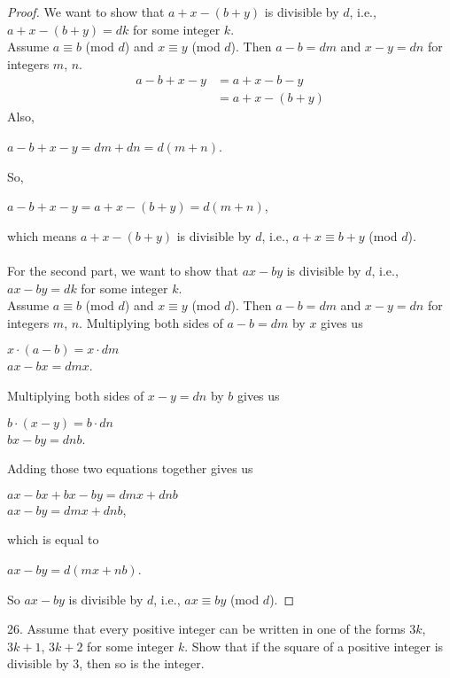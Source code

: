 \documentclass[12pt]{article}
\begin{document}
\begin{proof}
We want to show that $a+x-(b+y)$ is divisible by $d$, i.e., $a+x-(b+y)=dk$ for some integer $k$. \\
Assume $a\equiv b$ (mod $d$) and $x\equiv y$ (mod $d$). Then $a-b=dm$ and $x-y=dn$ for integers $m$, $n$.
\begin{align*}
a-b+x-y&=a+x-b-y \\
&=a+x-(b+y)
\end{align*}
Also,
\begin{center}
$a-b+x-y=dm+dn=d(m+n)$.
\end{center}
So,
\begin{center}
$a-b+x-y=a+x-(b+y)=d(m+n)$,
\end{center}
which means $a+x-(b+y)$ is divisible by $d$, i.e., $a+x\equiv b+y$ (mod $d$). \\
\\
For the second part, we want to show that $ax-by$ is divisible by $d$, i.e., $ax-by=dk$ for some integer $k$. \\
Assume $a\equiv b$ (mod $d$) and $x\equiv y$ (mod $d$). Then $a-b=dm$ and $x-y=dn$ for integers $m$, $n$.
Multiplying both sides of $a-b=dm$ by $x$ gives us
\begin{center}
$x\cdot(a-b)=x\cdot dm$ \\
$ax-bx=dmx$.
\end{center}
Multiplying both sides of $x-y=dn$ by $b$ gives us
\begin{center}
$b\cdot(x-y)=b\cdot dn$ \\
$bx-by=dnb$.
\end{center}
Adding those two equations together gives us
\begin{center}
$ax-bx+bx-by=dmx+dnb$ \\
$ax-by=dmx+dnb$,
\end{center}
which is equal to
\begin{center}
$ax-by=d(mx+nb)$.
\end{center}
So $ax-by$ is divisible by $d$, i.e., $ax\equiv by$ (mod $d$).
\end{proof}
26. Assume that every positive integer can be written in one of the forms $3k$, $3k+1$, $3k+2$ for some integer $k$. Show that if the square of a positive integer is divisible by 3, then so is the integer.
\end{document}
